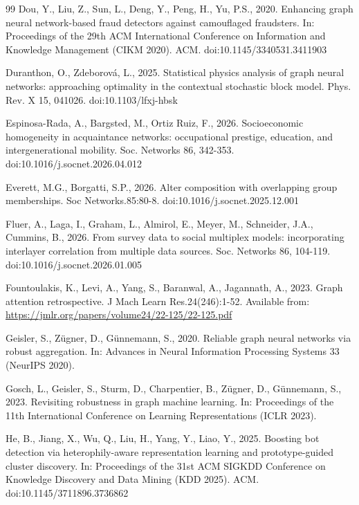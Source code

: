 \documentclass[onecolumn,pdflatex,sn-basic,Numbered]{sn-jnl}
\theoremstyle{thmstyleone}
\theoremstyle{thmstylethree}
\begin{document}
\begin{thebibliography}{99}
Dou, Y., Liu, Z., Sun, L., Deng, Y., Peng, H., Yu, P.S., 2020. Enhancing graph neural network-based fraud detectors against camouflaged fraudsters. In: Proceedings of the 29th ACM International Conference on Information and Knowledge Management (CIKM 2020). ACM. doi:10.1145/3340531.3411903

Duranthon, O., Zdeborov\'a, L., 2025. Statistical physics analysis of graph neural networks: approaching optimality in the contextual stochastic block model. Phys. Rev. X 15, 041026. doi:10.1103/lfxj-hbsk

Espinosa-Rada, A., Bargsted, M., Ortiz Ruiz, F., 2026. Socioeconomic homogeneity in acquaintance networks: occupational prestige, education, and intergenerational mobility. Soc. Networks 86, 342-353. doi:10.1016/j.socnet.2026.04.012

Everett, M.G., Borgatti, S.P., 2026. Alter composition with overlapping group memberships. Soc Networks.85:80-8. doi:10.1016/j.socnet.2025.12.001

Fluer, A., Laga, I., Graham, L., Almirol, E., Meyer, M., Schneider, J.A., Cummins, B., 2026. From survey data to social multiplex models: incorporating interlayer correlation from multiple data sources. Soc. Networks 86, 104-119. doi:10.1016/j.socnet.2026.01.005

Fountoulakis, K., Levi, A., Yang, S., Baranwal, A., Jagannath, A., 2023. Graph attention retrospective. J Mach Learn Res.24(246):1-52. Available from: \url{https://jmlr.org/papers/volume24/22-125/22-125.pdf}

Geisler, S., Z\"ugner, D., G\"unnemann, S., 2020. Reliable graph neural networks via robust aggregation. In: Advances in Neural Information Processing Systems 33 (NeurIPS 2020).

Gosch, L., Geisler, S., Sturm, D., Charpentier, B., Z\"ugner, D., G\"unnemann, S., 2023. Revisiting robustness in graph machine learning. In: Proceedings of the 11th International Conference on Learning Representations (ICLR 2023).

He, B., Jiang, X., Wu, Q., Liu, H., Yang, Y., Liao, Y., 2025. Boosting bot detection via heterophily-aware representation learning and prototype-guided cluster discovery. In: Proceedings of the 31st ACM SIGKDD Conference on Knowledge Discovery and Data Mining (KDD 2025). ACM. doi:10.1145/3711896.3736862


\end{thebibliography}
\end{document}
